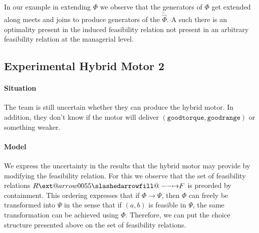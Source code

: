 \documentclass[12pt]{article}
\makeatletter
\theoremstyle{definition}
\theoremstyle{plain}
\theoremstyle{plain}
\theoremstyle{plain}
\theoremstyle{plain}
\theoremstyle{remark}
\theoremstyle{remark}
\def\slashedarrowfill@#1#2#3#4#5{%
	$\m@th\thickmuskip0mu\medmuskip\thickmuskip\thinmuskip\thickmuskip
	\relax#5#1\mkern-7mu%
	\cleaders\hbox{$#5\mkern-2mu#2\mkern-2mu$}\hfill
	\mathclap{#3}\mathclap{#2}%
	\cleaders\hbox{$#5\mkern-2mu#2\mkern-2mu$}\hfill
	\mkern-7mu#4$%
}
\def\rightslashedarrowfill@{%
	\slashedarrowfill@\relbar\relbar\mapstochar\rightarrow}
\newcommand\xslashedrightarrow[2][]{%
	\ext@arrow 0055{\rightslashedarrowfill@}{#1}{#2}}
\makeatother
\begin{document}
In our example in extending $\Phi$ we observe that the generators of $\Phi$ get extended along meets and joins to produce generators of the $\tilde\hat\Phi$. A such there is an optimality present in the induced feasibility relation not present in an arbitrary feasibility relation at the managerial level.

\subsection{Experimental Hybrid Motor 2}
\paragraph{Situation} The team is still uncertain whether they can produce the hybrid motor. In addition, they don't know if the motor will deliver $\mathtt{(good torque, good range)}$ or something weaker.

\paragraph{Model} We express the uncertainty in the results that the hybrid motor may provide by modifying the feasibility relation. For this we observe that the set of feasibility relations $R \xslashedrightarrow{} F$ is preorded by containment. This ordering expresses that if $\Phi \rightarrow \Psi$, then $\Phi$ can freely be transformed into $\Psi$ in the sense that if $(a,b)$ is feasible in $\Psi$, the same transformation can be achieved using $\Phi$. Therefore, we can put the choice structure presented above on the set of feasibility relations.



\newpage
\printbibliography
\end{document}
